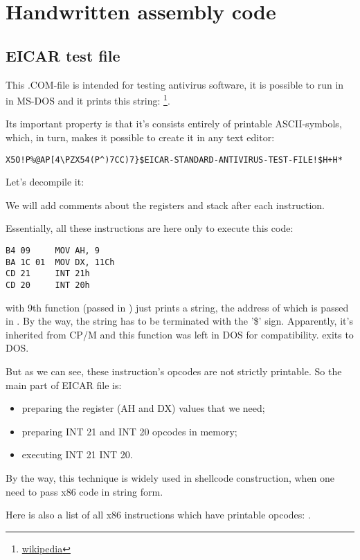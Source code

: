 \section{Handwritten assembly code}

\subsection{ EICAR test file}
\label{subsec:EICAR}

This .COM-file is intended for testing antivirus software, it is possible to run in
in MS-DOS and it prints this string: 
\footnote{\href{http://go.yurichev.com/17006}{wikipedia}}.

Its important property is that it's consists entirely of printable 
ASCII-symbols, which, in turn, makes it possible to create it in any text editor:

\begin{lstlisting}
X5O!P%@AP[4\PZX54(P^)7CC)7}$EICAR-STANDARD-ANTIVIRUS-TEST-FILE!$H+H*
\end{lstlisting}

Let's decompile it:



%
We will add comments about the registers and stack after each instruction.

Essentially, all these
instructions are here only to execute this code:

\begin{lstlisting}
B4 09     MOV AH, 9
BA 1C 01  MOV DX, 11Ch
CD 21     INT 21h
CD 20     INT 20h
\end{lstlisting}

 with 9th
function (passed in ) just prints a string, the address of which is passed in .
By the way, the string has to be terminated
with the '\$' sign.
Apparently, it's inherited from \gls{CP/M} 
and this function was left in DOS for compatibility.
 exits to DOS.

But as we can see, these instruction's
opcodes are not strictly printable.
So the main part of EICAR file is:

\begin{itemize}
\item preparing the register (AH and DX) values that we need;
\item preparing INT 21 and INT 20 opcodes in memory;
\item executing INT 21 \AndENRU INT 20.
\end{itemize}


By the way, this technique is widely used in shellcode construction, when one need to pass x86 code
in string form.

Here is also a list of all 
x86 instructions which have printable opcodes: .
